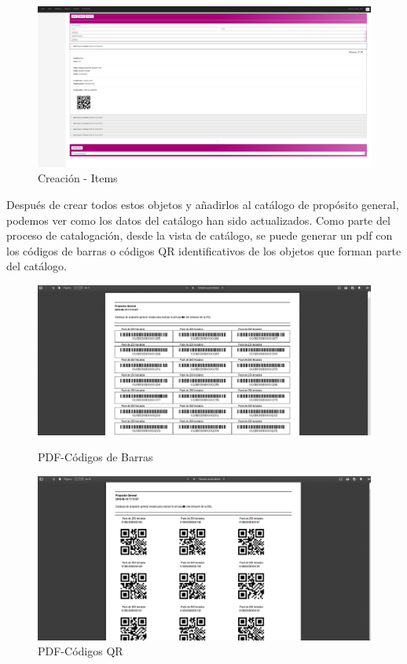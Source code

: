 \documentclass[a4paper,11pt]{book}
\begin{document}
\begin{figure}[H] 
\centering 
\includegraphics[scale=0.2]{imagenes/pruebas/add_catalogo.png}
\caption{ Creación - Items\cite{propio}}
\end{figure}

Después de crear todos estos objetos y añadirlos al catálogo de propósito general, podemos ver como los datos del catálogo han sido actualizados. Como parte del proceso de catalogación, desde la vista de catálogo, se puede generar un pdf con los códigos de barras o códigos QR identificativos de los objetos que forman parte del catálogo.  

\begin{figure}[H]
  \includegraphics[width=\linewidth]{imagenes/pruebas/barras.png}
  \caption{PDF-Códigos de Barras\cite{propio}}
\endminipage\hfill
{}
  \includegraphics[width=\linewidth]{imagenes/pruebas/qr.png}
  \caption{PDF-Códigos QR\cite{propio}}
\endminipage\hfill

\end{figure}
\end{document}
